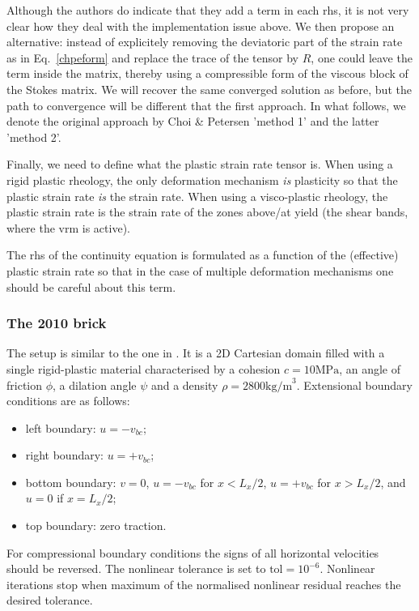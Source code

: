 Although the authors do indicate that they add a term in each rhs, it is not very clear how they deal with
the implementation issue above. We then propose an alternative: instead of explicitely removing the deviatoric 
part of the strain rate as in Eq.~\ref{chpeform} and replace the trace of the tensor by $R$, one could 
leave the term inside the matrix, thereby using a compressible form of the viscous block of the Stokes 
matrix. We will recover the same converged solution as before, but the path to convergence will be 
different that the first approach.
In what follows, we denote the original approach by Choi \& Petersen 'method 1' and the latter 'method 2'.


Finally, we need to define what the plastic strain rate tensor is. When using a rigid plastic 
rheology, the only deformation mechanism {\it is} plasticity so that the plastic strain rate {\it is}
the strain rate. When using a visco-plastic rheology, the plastic strain rate is the strain rate 
of the zones above/at yield (the shear bands, where the vrm is active).

\begin{remark}
The rhs of the continuity equation is formulated as a function of the (effective) plastic strain rate so that 
in the case of multiple deformation mechanisms one should be careful about this term.
\end{remark}
 
\subsubsection*{The 2010 brick}

The setup is similar to the one in \cite{kaus10}. It is a 2D Cartesian domain filled with a 
single rigid-plastic material characterised by a cohesion $c=10\text{MPa}$, an 
angle of friction $\phi$, a dilation angle $\psi$ and a density $\rho=2800\text{kg/m}^3$.
Extensional boundary conditions are as follows: 
\begin{itemize}
\item left boundary: $u=- v_{bc}$;
\item right boundary: $u=+ v_{bc}$; 
\item bottom boundary: $v=0$, $u=- v_{bc}$ for $x<L_x/2$,  $u=+ v_{bc}$ for $x>L_x/2$, and $u=0$ if $x=L_x/2$;
\item top boundary: zero traction.
\end{itemize}
For compressional boundary conditions the signs of all horizontal velocities should be reversed.
The nonlinear tolerance is set to $\text{tol}=10^{-6}$. Nonlinear iterations stop when 
maximum of the normalised nonlinear residual reaches the desired tolerance.

